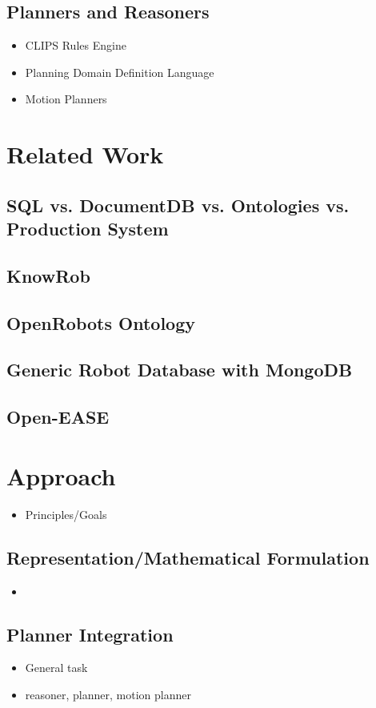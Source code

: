\documentclass[a4paper,11pt]{article}
\begin{document}
\subsection{Planners and Reasoners}
\begin{itemize}
\item CLIPS Rules Engine
\item Planning Domain Definition Language
\item Motion Planners
\end{itemize}


\section{Related Work}
\subsection{SQL vs. DocumentDB vs. Ontologies vs. Production System}
\subsection{KnowRob}
\subsection{OpenRobots Ontology}
\subsection{Generic Robot Database with MongoDB}
\subsection{Open-EASE}


\section{Approach}
\begin{itemize}
\item Principles/Goals
\end{itemize}
\subsection{Representation/Mathematical Formulation}
\begin{itemize}
\item 
\end{itemize}
\subsection{Planner Integration}
\begin{itemize}
\item General task
\item reasoner, planner, motion planner
\end{itemize}
\end{document}
